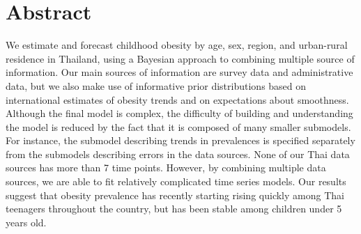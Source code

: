 \documentclass[10pt,letterpaper]{article}
\newcommand{\getIndex}[2]{
  \ForEach{,}{\IfEq{#1}{\thislevelitem}{\number\thislevelcount\ExitForEach}{}}{#2}
}
\newcommand{\getAff}[1]{
  \getIndex{#1}{BDL,IPSR,FM,DP}
}
\begin{document}
\vspace*{0.2in}

\section*{Abstract}
We estimate and forecast childhood obesity by age, sex, region, and
urban-rural residence in Thailand, using a Bayesian approach to
combining multiple source of information. Our main sources of
information are survey data and administrative data, but we also make
use of informative prior distributions based on international estimates
of obesity trends and on expectations about smoothness. Although the
final model is complex, the difficulty of building and understanding the
model is reduced by the fact that it is composed of many smaller
submodels. For instance, the submodel describing trends in prevalences
is specified separately from the submodels describing errors in the data
sources. None of our Thai data sources has more than 7 time points.
However, by combining multiple data sources, we are able to fit
relatively complicated time series models. Our results suggest that
obesity prevalence has recently starting rising quickly among Thai
teenagers throughout the country, but has been stable among children
under 5 years old.
\end{document}
